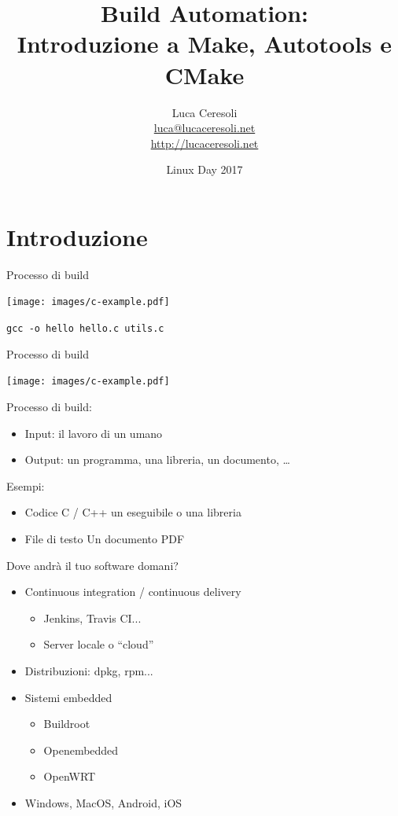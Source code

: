 \documentclass[xetex,table]{beamer}
\title{Build Automation:\\Introduzione a Make, Autotools e CMake}
\author{Luca Ceresoli\\
  \href{mailto:luca@lucaceresoli.net}{luca@lucaceresoli.net}\\
  \url{http://lucaceresoli.net}
}
\date{Linux Day 2017}
\begin{document}
\maketitle

\section{Introduzione}

\begin{frame}{Processo di build}
  \begin{center}
    \texttt{[image: images/c-example.pdf]}

    \pause
    \vspace{0.1\textheight}
    \texttt{gcc -o hello hello.c utils.c}
  \end{center}
\end{frame}

\begin{frame}{Processo di build}
  \begin{flushright}
    \texttt{[image: images/c-example.pdf]}
  \end{flushright}

  Processo di build:
  \begin{itemize}
  \item Input: il lavoro di un umano
  \item Output: un programma, una libreria, un documento, \dots
  \end{itemize}

  Esempi:
  \begin{itemize}
  \item Codice C / C++ \textrightarrow{} un eseguibile o una libreria
  \item File di testo \textrightarrow{} Un documento PDF
  \end{itemize}
\end{frame}

\begin{frame}{Dove andrà il tuo software domani?}
  \begin{itemize}
  \item Continuous integration / continuous delivery
    \begin{itemize}
    \item Jenkins, Travis CI...
    \item Server locale o ``cloud''
    \end{itemize}
    \pause
  \item Distribuzioni: dpkg, rpm...
    \pause
  \item Sistemi embedded
    \begin{itemize}
    \item Buildroot
    \item Openembedded
    \item OpenWRT
    \end{itemize}
    \pause
  \item Windows, MacOS, Android, iOS
  \end{itemize}
\end{frame}
\end{document}
